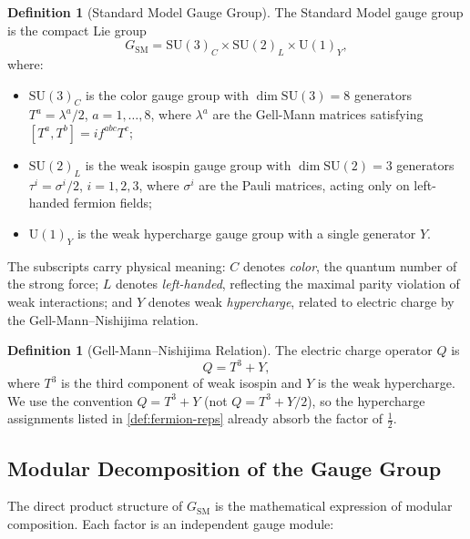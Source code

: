 \documentclass[12pt]{article}
\theoremstyle{definition}
\newtheorem{definition}[theorem]{Definition}
\theoremstyle{remark}
\newcommand{\su}[1]{\mathrm{SU}(#1)}
\newcommand{\uu}[1]{\mathrm{U}(#1)}
\begin{document}
\begin{definition}[Standard Model Gauge Group]
\label{def:sm-gauge-group}
The Standard Model gauge group is the compact Lie group
\begin{equation}
\label{eq:gauge-group}
G_{\mathrm{SM}} = \su{3}_C \times \su{2}_L \times \uu{1}_Y,
\end{equation}
where:
\begin{itemize}
\item $\su{3}_C$ is the color gauge group with $\dim \su{3} = 8$ generators $T^a = \lambda^a/2$, $a = 1, \ldots, 8$, where $\lambda^a$ are the Gell-Mann matrices satisfying $[T^a, T^b] = i f^{abc} T^c$;
\item $\su{2}_L$ is the weak isospin gauge group with $\dim \su{2} = 3$ generators $\tau^i = \sigma^i/2$, $i = 1, 2, 3$, where $\sigma^i$ are the Pauli matrices, acting only on left-handed fermion fields;
\item $\uu{1}_Y$ is the weak hypercharge gauge group with a single generator $Y$.
\end{itemize}
\end{definition}

The subscripts carry physical meaning: $C$ denotes \emph{color}, the quantum number of the strong force; $L$ denotes \emph{left-handed}, reflecting the maximal parity violation of weak interactions; and $Y$ denotes weak \emph{hypercharge}, related to electric charge by the Gell-Mann--Nishijima relation.

\begin{definition}[Gell-Mann--Nishijima Relation]
\label{def:gmn}
The electric charge operator $Q$ is
\begin{equation}
\label{eq:gmn}
Q = T^3 + Y,
\end{equation}
where $T^3$ is the third component of weak isospin and $Y$ is the weak hypercharge. We use the convention $Q = T^3 + Y$ (not $Q = T^3 + Y/2$), so the hypercharge assignments listed in \cref{def:fermion-reps} already absorb the factor of $\frac{1}{2}$.
\end{definition}

\subsection{Modular Decomposition of the Gauge Group}

The direct product structure of $G_{\mathrm{SM}}$ is the mathematical expression of modular composition. Each factor is an independent gauge module:
\end{document}
